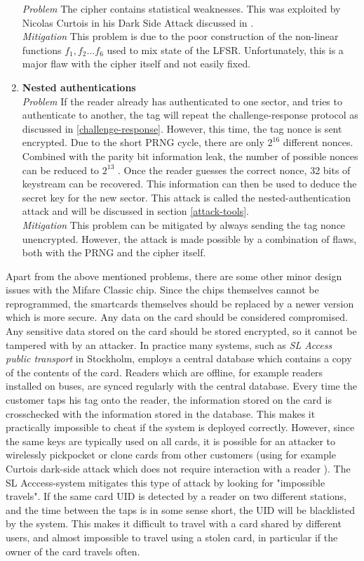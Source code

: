 \documentclass[10pt,twocolumn]{article}
\begin{document}
\begin{enumerate}
    \textit{Problem} The cipher contains statistical weaknesses. This was exploited by Nicolas Curtois in his Dark Side Attack discussed in \cite{curtois09}.\\
    \textit{Mitigation} This problem is due to the poor construction of the non-linear functions $f_1, f_2\ldots f_6$ used to mix state of the LFSR. Unfortunately, this is a major flaw with the cipher itself and not easily fixed.
    \item \textbf{Nested authentications}\\
    \textit{Problem} If the reader already has authenticated to one sector, and tries to authenticate to another, the tag will repeat the challenge-response protocol as discussed in \ref{challenge-response}. However, this time, the tag nonce is sent encrypted. Due to the short PRNG cycle, there are only $2^{16}$ different nonces. Combined with the parity bit information leak, the number of possible nonces can be reduced to $2^{13}$ \cite{garcia09}. Once the reader guesses the correct nonce, 32 bits of keystream can be recovered. This information can then be used to deduce the secret key for the new sector. This attack is called the nested-authentication attack and will be discussed in section \ref{attack-tools}.\\
    \textit{Mitigation} This problem can be mitigated by always sending the tag nonce unencrypted. However, the attack is made possible by a combination of flaws, both with the PRNG and the cipher itself.
\end{enumerate}

Apart from the above mentioned problems, there are some other minor design issues with the Mifare Classic chip. Since the chips themselves cannot be reprogrammed, the smartcards themselves should be replaced by a newer version which is more secure. Any data on the card should be considered compromised. Any sensitive data stored on the card should be stored encrypted, so it cannot be tampered with by an attacker. In practice many systems, such as \textit{SL Access public transport} in Stockholm, employs a central database which contains a copy of the contents of the card. Readers which are offline, for example readers installed on buses, are synced regularly with the central database. Every time the customer taps his tag onto the reader, the information stored on the card is crosschecked with the information stored in the database. This makes it practically impossible to cheat if the system is deployed correctly. However, since the same keys are typically used on all cards, it is possible for an attacker to wirelessly pickpocket or clone cards from other customers (using for example Curtois dark-side attack which does not require interaction with a reader \cite{curtois09}). The SL Acccess-system mitigates this type of attack by looking for "impossible travels". If the same card UID is detected by a reader on two different stations, and the time between the taps is in some sense short, the UID will be blacklisted by the system. This makes it difficult to travel with a card shared by different users, and almost impossible to travel using a stolen card, in particular if the owner of the card travels often.
\end{document}
